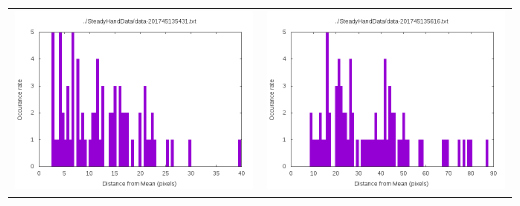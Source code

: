 \documentclass[10pt,letterpaper]{article}
\begin{document}
\begin{table}
\begin{tabular}{cc}
\includegraphics[scale=.5]{graph-data-201745135431.png} & \includegraphics[scale=.5]{graph-data-201745135616.png}\\
\end{tabular}
\end{table}
\end{document}
